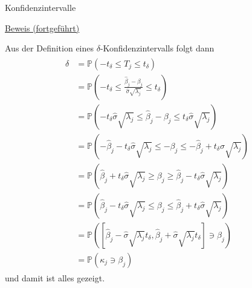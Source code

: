 \documentclass[
  8pt,
  ignorenonframetext,
]{beamer}
\begin{document}
\begin{frame}{Konfidenzintervalle}
\protect\hypertarget{konfidenzintervalle-2}{}
\footnotesize

\underline{Beweis (fortgeführt)}

Aus der Definition eines \(\delta\)-Konfidenzintervalls folgt dann
\begin{align}
\begin{split}
\delta 
& = \mathbb{P}\left(-t_\delta \le T_j \le t_\delta \right) \\
& = \mathbb{P}\left(-t_\delta \le \frac{\hat{\beta}_j - \beta_j}{\hat{\sigma}\sqrt{\lambda_j}} \le t_\delta \right) \\
& = \mathbb{P}\left(-t_\delta\hat{\sigma}\sqrt{\lambda_j} \le \hat{\beta}_j - \beta_j \le t_\delta\hat{\sigma}\sqrt{\lambda_j} \right) \\
& = \mathbb{P}\left(-\hat{\beta}_j -t_\delta\hat{\sigma}\sqrt{\lambda_j} \le - \beta_j \le -\hat{\beta}_j + t_\delta\hat{\sigma}\sqrt{\lambda_j} \right) \\
& = \mathbb{P}\left(\hat{\beta}_j + t_\delta\hat{\sigma}\sqrt{\lambda_j} \ge \beta_j \ge \hat{\beta}_j - t_\delta\hat{\sigma}\sqrt{\lambda_j} \right) \\
& = \mathbb{P}\left(\hat{\beta}_j - t_\delta\hat{\sigma}\sqrt{\lambda_j}  \le \beta_j \le \hat{\beta}_j + t_\delta\hat{\sigma}\sqrt{\lambda_j} \right) \\
& = \mathbb{P}\left(\left[\hat{\beta}_j - \hat{\sigma}\sqrt{\lambda_j}t_{\delta},\hat{\beta}_j + \hat{\sigma}\sqrt{\lambda_j}t_{\delta}\right]  \ni \beta_j \right) \\
& = \mathbb{P}(\kappa_j \ni \beta_j) 
\end{split}
\end{align} und damit ist alles gezeigt.
\end{frame}
\end{document}
